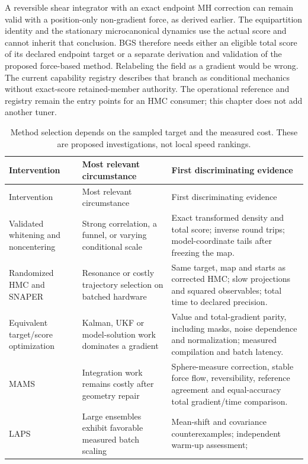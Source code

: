 A reversible shear integrator with an exact endpoint MH correction can
remain valid with a position-only non-gradient force, as derived earlier.
The equipartition identity and the stationary microcanonical dynamics use
the actual score and cannot inherit that conclusion. BGS therefore needs
either an eligible total score of its declared endpoint target or a separate
derivation and validation of the proposed force-based method. Relabeling the
field as a gradient would be wrong. The current capability registry describes
that branch as conditional mechanics without exact-score retained-member
authority. The operational reference and registry remain the entry points
for an HMC consumer; this chapter does not add another tuner.

\begin{longtable}{>{\raggedright\arraybackslash}p{}
>{\raggedright\arraybackslash}p{}
>{\raggedright\arraybackslash}p{}}
\caption{Method selection depends on the sampled target and the measured cost.
These are proposed investigations, not local speed rankings.}
\label{tab:bf-modern-adoption}\\
\toprule
Intervention & Most relevant circumstance & First discriminating evidence\\
\midrule
\endfirsthead
\toprule Intervention & Most relevant circumstance & First discriminating evidence\\
\midrule
\endhead
\bottomrule
\endfoot
Validated whitening and noncentering &
Strong correlation, a funnel, or varying conditional scale &
Exact transformed density and total score; inverse round trips; model-coordinate
tails after freezing the map.\\
Randomized HMC and SNAPER &
Resonance or costly trajectory selection on batched hardware &
Same target, map and starts as corrected HMC; slow projections and squared
observables; total time to declared precision.\\
Equivalent target/score optimization &
Kalman, UKF or model-solution work dominates a gradient &
Value and total-gradient parity, including masks, noise dependence and
normalization; measured compilation and batch latency.\\
MAMS &
Integration work remains costly after geometry repair &
Sphere-measure correction, stable force flow, reversibility, reference
agreement and equal-accuracy total gradient/time comparison.\\
LAPS &
Large ensembles exhibit favorable measured batch scaling &
Mean-shift and covariance counterexamples; independent warm-up assessment;

\end{longtable}
